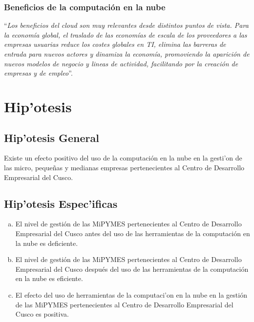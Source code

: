 \subsubsection{Beneficios de la computaci\'on en la nube}
``\emph{Los beneficios del cloud son muy relevantes desde distintos puntos de vista.
Para la econom\'ia global, el traslado de las econom\'ias de escala de los
proveedores a las empresas usuarias reduce los costes globales en TI, elimina
las barreras de entrada para nuevos actores y dinamiza la econom\'ia, promoviendo
la aparici\'on de nuevos modelos de negocio y lineas de actividad, facilitando
por la creaci\'on de empresas y de empleo}''\citep{cierco}.



\section{Hip'otesis}

\subsection{Hip'otesis General}

Existe un efecto positivo del uso de la computaci\'on en la nube en la
gesti'on de las micro, peque\~nas y medianas empresas pertenecientes al Centro de
Desarrollo Empresarial del Cusco.

\subsection{Hip'otesis Espec'ificas}
\begin{enumerate}[a.]
    \item El nivel de gesti\'on de las MiPYMES pertenecientes al Centro de Desarrollo
          Empresarial del Cusco antes del uso de las herramientas de la computaci\'on
          en la nube es deficiente.
    \item El nivel de gesti\'on de las MiPYMES pertenecientes al Centro de Desarrollo
          Empresarial del Cusco despu\'es del uso de las herramientas de la computaci\'on
          en la nube es eficiente.
    \item El efecto del uso de herramientas de la computaci'on en la nube en la
          gesti\'on de las MiPYMES pertenecientes al Centro de Desarrollo Empresarial
          del Cusco es positiva.
\end{enumerate}

